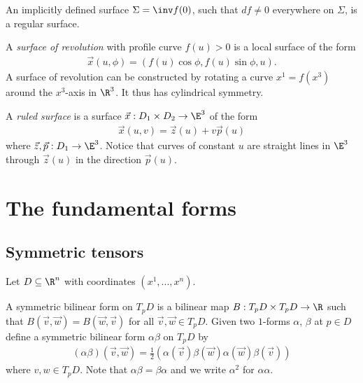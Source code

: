 \documentclass{article}
\begin{document}
\begin{proposition}[Notes 6.13]
	An implicitly defined surface $\Sigma = \inv f(0)$, such that $df\not=0$
	everywhere on $\Sigma$, is a regular surface.
\end{proposition}

\begin{definition}
	A \emph{surface of revolution} with profile curve $f(u)>0$ is a local
	surface of the form
	\begin{align*}
		\vec x(u, \phi) = (f(u)\cos\phi,f(u)\sin\phi,u).
	\end{align*}
	A surface of revolution can be constructed by rotating a curve $x^1=f(x^3)$
	around the $x^3$-axis in $\R^3$. It thus has cylindrical symmetry.
\end{definition}

\begin{definition}
	A \emph{ruled surface} is a surface $\vec x:D_1\times D_2\to\E^3$ of the form
	\begin{align*}
		\vec x(u,v)= \vec z(u) + v\vec p(u)
	\end{align*}
	where $\vec z,\vec p:D_1\to\E^3$.
	Notice that curves of constant $u$ are straight lines in $\E^3$ through
	$\vec z(u)$ in the direction $\vec p(u)$.
\end{definition}

\section{The fundamental forms}

\subsection{Symmetric tensors}

Let $D\subseteq\R^n$ with coordinates $(x^1,...,x^n)$.

\begin{definition}
	A symmetric bilinear form on $T_pD$ is a bilinear map $B:T_pD\times T_pD
		\to\R$ such that $B(\vec v,\vec w)=B(\vec w,\vec v)$ for all $\vec v,\vec w\in T_pD$. Given two $1$-forms
	$\alpha$, $\beta$ at $p\in D$ define a symmetric bilinear form $\alpha\beta$
	on $T_pD$ by
	\begin{align*}
		(\alpha\beta)(\vec v, \vec w) = \frac{1}{2}(\alpha(\vec v)\beta(\vec w) \alpha(\vec w)\beta(\vec v))
	\end{align*}
	where $v,w\in T_pD$. Note that $\alpha\beta=\beta\alpha$ and we write $\alpha^2$
	for $\alpha\alpha$.
\end{definition}
\end{document}
